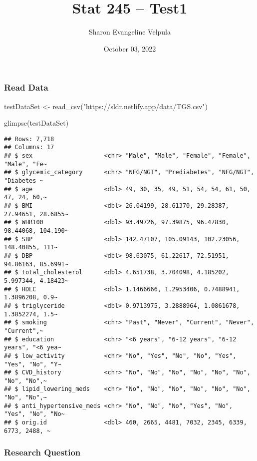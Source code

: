 \documentclass[
]{article}
\title{Stat 245 -- Test1}
\author{Sharon Evangeline Velpula}
\date{October 03, 2022}
\newenvironment{Shaded}{\begin{snugshade}}{\end{snugshade}}
\newcommand{\FunctionTok}[1]{\textcolor[rgb]{0.00,0.00,0.00}{#1}}
\newcommand{\NormalTok}[1]{#1}
\newcommand{\OtherTok}[1]{\textcolor[rgb]{0.56,0.35,0.01}{#1}}
\newcommand{\StringTok}[1]{\textcolor[rgb]{0.31,0.60,0.02}{#1}}
\begin{document}
\maketitle

\hypertarget{read-data}{%
\subsubsection{Read Data}\label{read-data}}

\begin{Shaded}
\begin{Highlighting}[]
\NormalTok{testDataSet }\OtherTok{\textless{}{-}} \FunctionTok{read\_csv}\NormalTok{(}\StringTok{"https://sldr.netlify.app/data/TGS.csv"}\NormalTok{)}

\FunctionTok{glimpse}\NormalTok{(testDataSet)}
\end{Highlighting}
\end{Shaded}

\begin{verbatim}
## Rows: 7,718
## Columns: 17
## $ sex                    <chr> "Male", "Male", "Female", "Female", "Male", "Fe~
## $ glycemic_category      <chr> "NFG/NGT", "Prediabetes", "NFG/NGT", "Diabetes ~
## $ age                    <dbl> 49, 30, 35, 49, 51, 54, 54, 61, 50, 47, 24, 60,~
## $ BMI                    <dbl> 26.04199, 28.61370, 29.28387, 27.94651, 28.6855~
## $ WHR100                 <dbl> 93.49726, 97.39875, 96.47830, 98.44068, 104.190~
## $ SBP                    <dbl> 142.47107, 105.09143, 102.23056, 148.40855, 111~
## $ DBP                    <dbl> 98.63075, 61.22617, 72.51951, 94.86163, 85.6991~
## $ total_cholesterol      <dbl> 4.651738, 3.704098, 4.185202, 5.997344, 4.18423~
## $ HDLC                   <dbl> 1.1466666, 1.2953406, 0.7488941, 1.3896208, 0.9~
## $ triglyceride           <dbl> 0.9713975, 3.2888964, 1.0861678, 1.3852274, 1.5~
## $ smoking                <chr> "Past", "Never", "Current", "Never", "Current",~
## $ education              <chr> "<6 years", "6-12 years", "6-12 years", "<6 yea~
## $ low_activity           <chr> "No", "Yes", "No", "No", "Yes", "Yes", "No", "Y~
## $ CVD_history            <chr> "No", "No", "No", "No", "No", "No", "No", "No",~
## $ lipid_lowering_meds    <chr> "No", "No", "No", "No", "No", "No", "No", "No",~
## $ anti_hypertensive_meds <chr> "No", "No", "No", "Yes", "No", "Yes", "No", "No~
## $ orig.id                <dbl> 460, 2665, 4481, 7032, 2345, 6339, 6773, 2488, ~
\end{verbatim}

\hypertarget{research-question}{%
\subsubsection{Research Question}\label{research-question}}
\end{document}
